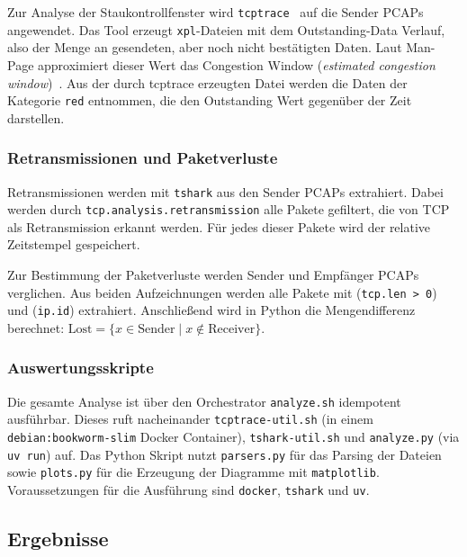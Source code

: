 Zur Analyse der Staukontrollfenster wird \texttt{tcptrace}~\cite{tcptrace} auf die Sender PCAPs angewendet.
Das Tool erzeugt \texttt{xpl}-Dateien mit dem Outstanding-Data Verlauf, also der Menge an gesendeten, aber noch nicht bestätigten Daten.
Laut Man-Page approximiert dieser Wert das Congestion Window (\textit{estimated congestion window})~\cite{tcptrace}.
Aus der durch tcptrace erzeugten Datei werden die Daten der Kategorie \texttt{red} entnommen, die den Outstanding Wert gegenüber der Zeit darstellen.

\subsubsection{Retransmissionen und Paketverluste}

Retransmissionen werden mit \texttt{tshark} aus den Sender PCAPs extrahiert.
Dabei werden durch \texttt{tcp.\allowbreak{}analysis.\allowbreak{}retransmission} alle Pakete gefiltert, die von TCP als Retransmission erkannt werden.
Für jedes dieser Pakete wird der relative Zeitstempel gespeichert.

Zur Bestimmung der Paketverluste werden Sender und Empfänger PCAPs verglichen.
Aus beiden Aufzeichnungen werden alle Pakete mit (\texttt{tcp.len > 0}) und (\texttt{ip.id}) extrahiert.
Anschließend wird in Python die Mengendifferenz berechnet: $\text{Lost} = \{ x \in \text{Sender} \mid x \notin \text{Receiver} \}$.

\subsubsection{Auswertungsskripte}

Die gesamte Analyse ist über den Orchestrator \texttt{analyze.sh} idempotent ausführbar.
Dieses ruft nacheinander \texttt{tcptrace-\allowbreak{}util.sh} (in einem \texttt{debian:\allowbreak{}bookworm-\allowbreak{}slim} Docker Container), \texttt{tshark-\allowbreak{}util.sh} und \texttt{analyze.py} (via \texttt{uv run}) auf.
Das Python Skript nutzt \texttt{parsers.py} für das Parsing der Dateien sowie \texttt{plots.py} für die Erzeugung der Diagramme mit \texttt{matplotlib}.
Voraussetzungen für die Ausführung sind \texttt{docker}, \texttt{tshark} und \texttt{uv}.

\FloatBarrier{}
\subsection{Ergebnisse}\label{sec:reno-cubic-ergebnisse}

